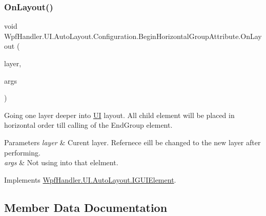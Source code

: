 \subsubsection{\texorpdfstring{On\+Layout()}{OnLayout()}}
{\footnotesize\ttfamily void Wpf\+Handler.\+U\+I.\+Auto\+Layout.\+Configuration.\+Begin\+Horizontal\+Group\+Attribute.\+On\+Layout (\begin{DoxyParamCaption}\item[{ref \mbox{\hyperlink{class_wpf_handler_1_1_u_i_1_1_auto_layout_1_1_layout_layer}{Layout\+Layer}}}]{layer,  }\item[{params object \mbox{[}$\,$\mbox{]}}]{args }\end{DoxyParamCaption})}



Going one layer deeper into \mbox{\hyperlink{namespace_wpf_handler_1_1_u_i}{UI}} layout. All child element will be placed in horizontal order till calling of the End\+Group element. 


\begin{DoxyParams}{Parameters}
{\em layer} & Curent layer. Refernece eill be changed to the new layer after performing.\\
\hline
{\em args} & Not using into that elelment.\\
\hline
\end{DoxyParams}


Implements \mbox{\hyperlink{interface_wpf_handler_1_1_u_i_1_1_auto_layout_1_1_i_g_u_i_element_a0ff16956f8e8187d51e1b36b6b9f894e}{Wpf\+Handler.\+U\+I.\+Auto\+Layout.\+I\+G\+U\+I\+Element}}.



\subsection{Member Data Documentation}
\mbox{\label{class_wpf_handler_1_1_u_i_1_1_auto_layout_1_1_configuration_1_1_begin_horizontal_group_attribute_af50995071c008ef3fff87aa189a8256f}} 
